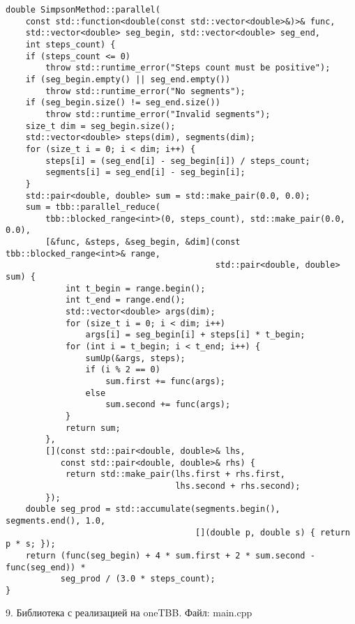 \documentclass{report}
\begin{document}
\begin{lstlisting}
double SimpsonMethod::parallel(
    const std::function<double(const std::vector<double>&)>& func,
    std::vector<double> seg_begin, std::vector<double> seg_end,
    int steps_count) {
    if (steps_count <= 0)
        throw std::runtime_error("Steps count must be positive");
    if (seg_begin.empty() || seg_end.empty())
        throw std::runtime_error("No segments");
    if (seg_begin.size() != seg_end.size())
        throw std::runtime_error("Invalid segments");
    size_t dim = seg_begin.size();
    std::vector<double> steps(dim), segments(dim);
    for (size_t i = 0; i < dim; i++) {
        steps[i] = (seg_end[i] - seg_begin[i]) / steps_count;
        segments[i] = seg_end[i] - seg_begin[i];
    }
    std::pair<double, double> sum = std::make_pair(0.0, 0.0);
    sum = tbb::parallel_reduce(
        tbb::blocked_range<int>(0, steps_count), std::make_pair(0.0, 0.0),
        [&func, &steps, &seg_begin, &dim](const tbb::blocked_range<int>& range,
                                          std::pair<double, double> sum) {
            int t_begin = range.begin();
            int t_end = range.end();
            std::vector<double> args(dim);
            for (size_t i = 0; i < dim; i++)
                args[i] = seg_begin[i] + steps[i] * t_begin;
            for (int i = t_begin; i < t_end; i++) {
                sumUp(&args, steps);
                if (i % 2 == 0)
                    sum.first += func(args);
                else
                    sum.second += func(args);
            }
            return sum;
        },
        [](const std::pair<double, double>& lhs,
           const std::pair<double, double>& rhs) {
            return std::make_pair(lhs.first + rhs.first,
                                  lhs.second + rhs.second);
        });
    double seg_prod = std::accumulate(segments.begin(), segments.end(), 1.0,
                                      [](double p, double s) { return p * s; });
    return (func(seg_begin) + 4 * sum.first + 2 * sum.second - func(seg_end)) *
           seg_prod / (3.0 * steps_count);
}
\end{lstlisting}

\par 9. Библиотека с реализацией на oneTBB. Файл: main.cpp
\end{document}
